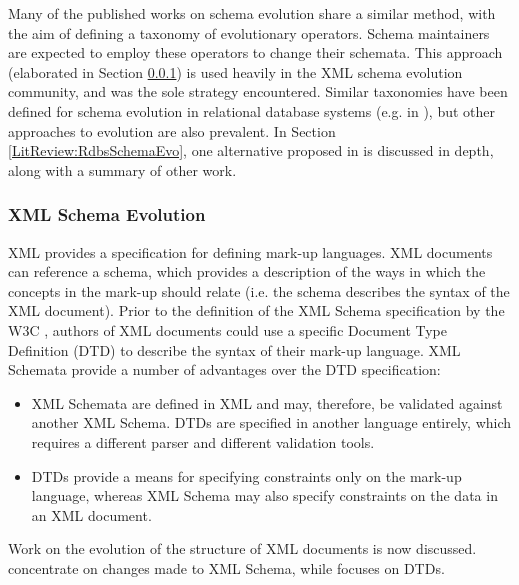 Many of the published works on schema evolution share a similar method, with the aim of defining a taxonomy of evolutionary operators. Schema maintainers are expected to employ these operators to change their schemata. This approach (elaborated in Section \ref{LitReview:XmlSchemaEvo}) is used heavily in the XML schema evolution community, and was the sole strategy encountered. Similar taxonomies have been defined for schema evolution in relational database systems (e.g. in \cite{banerjee87semantics,edelweiss05temporal}), but other approaches to evolution are also prevalent. In Section \ref{LitReview:RdbsSchemaEvo}, one alternative proposed in \cite{lerner00model} is discussed in depth, along with a summary of other work.


\subsubsection{XML Schema Evolution}
\label{LitReview:XmlSchemaEvo}
XML provides a specification for defining mark-up languages. XML documents can reference a schema, which provides a description of the ways in which the concepts in the mark-up should relate (i.e. the schema describes the syntax of the XML document). Prior to the definition of the XML Schema specification \cite{xmlschema} by the W3C \cite{w3c}, authors of XML documents could use a specific Document Type Definition (DTD) to describe the syntax of their mark-up language. XML Schemata provide a number of advantages over the DTD specification:

\begin{itemize}
 \item XML Schemata are defined in XML and may, therefore, be validated against another XML Schema. DTDs are specified in another language entirely, which requires a different parser and different validation tools.
 \item DTDs provide a means for specifying constraints only on the mark-up language, whereas XML Schema may also specify constraints on the data in an XML document.
\end{itemize}

Work on the evolution of the structure of XML documents is now discussed. \cite{guerrini05impact} concentrate on changes made to XML Schema, while \cite{kramer01xem} focuses on DTDs.

